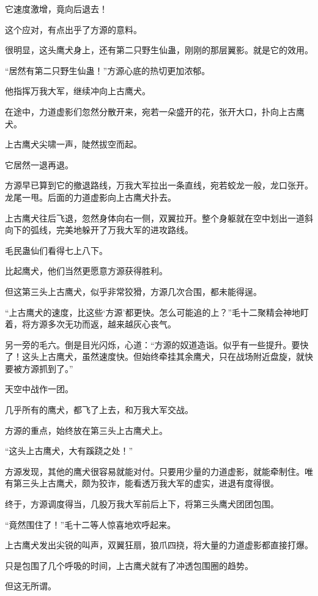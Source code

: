 \begin{this_body}
它速度激增，竟向后退去！

这个应对，有点出乎了方源的意料。

很明显，这头鹰犬身上，还有第二只野生仙蛊，刚刚的那层翼影。就是它的效用。

“居然有第二只野生仙蛊！”方源心底的热切更加浓郁。

他指挥万我大军，继续冲向上古鹰犬。

在途中，力道虚影们忽然分散开来，宛若一朵盛开的花，张开大口，扑向上古鹰犬。

上古鹰犬尖啸一声，陡然拔空而起。

它居然一退再退。

方源早已算到它的撤退路线，万我大军拉出一条直线，宛若蛟龙一般，龙口张开。龙尾一甩。后面的力道虚影向上古鹰犬扑去。

上古鹰犬往后飞退，忽然身体向右一侧，双翼拉开。整个身躯就在空中划出一道斜向下的弧线，完美地躲开了万我大军的进攻路线。

毛民蛊仙们看得七上八下。

比起鹰犬，他们当然更愿意方源获得胜利。

但这第三头上古鹰犬，似乎非常狡猾，方源几次合围，都未能得逞。

“上古鹰犬的速度，比这些‘方源’都更快。怎么可能追的上？”毛十二聚精会神地盯着，将方源多次无功而返，越来越灰心丧气。

另一旁的毛六。倒是目光闪烁，心道：“方源的奴道造诣。似乎有一些提升。要快了！这头上古鹰犬，虽然速度快。但始终牵挂其余鹰犬，只在战场附近盘旋，就快要被方源抓到了。”

天空中战作一团。

几乎所有的鹰犬，都飞了上去，和万我大军交战。

方源的重点，始终放在第三头上古鹰犬上。

“这头上古鹰犬，大有蹊跷之处！”

方源发现，其他的鹰犬很容易就能对付。只要用少量的力道虚影，就能牵制住。唯有第三头上古鹰犬，颇为狡诈，能看透万我大军的虚实，进退有度得很。

终于，方源调度得当，几股万我大军前后上下，将第三头鹰犬团团包围。

“竟然围住了！”毛十二等人惊喜地欢呼起来。

上古鹰犬发出尖锐的叫声，双翼狂扇，狼爪四挠，将大量的力道虚影都直接打爆。

只是包围了几个呼吸的时间，上古鹰犬就有了冲透包围圈的趋势。

但这无所谓。


\end{this_body}
